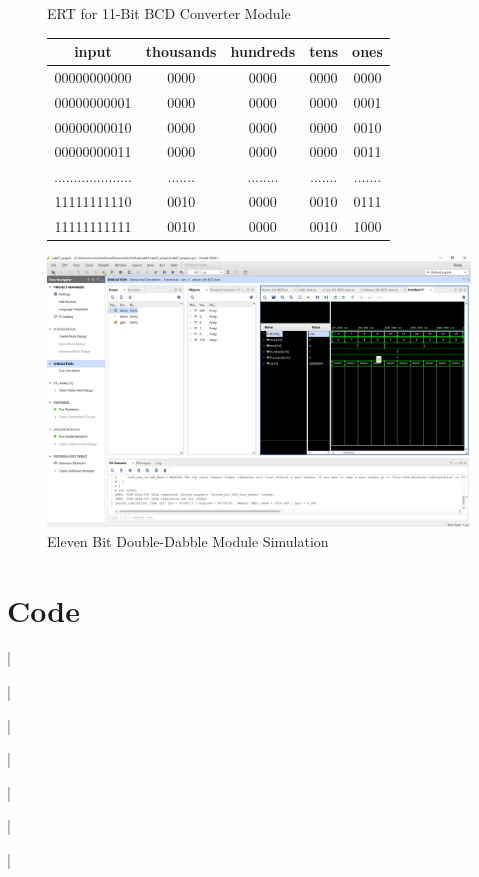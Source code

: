 \documentclass[11pt]{article}
\newcommand{\Verilog}[2][]{%
	
}
\begin{document}
\begin{figure}[ht]\centering
	\caption{ERT for 11-Bit BCD Converter Module}
		\label{tbl:example_table}
		\begin{tabular}{c|cccc}
			\toprule
			input & thousands & hundreds & tens & ones \\
			\midrule
			00000000000 & 0000 & 0000 & 0000 & 0000 \\
			00000000001 & 0000 & 0000 & 0000 & 0001 \\
			00000000010 & 0000 & 0000 & 0000 & 0010 \\
			00000000011 & 0000 & 0000 & 0000 & 0011 \\
			.................... & ....... & ........ & ....... & ....... \\
			11111111110 & 0010 & 0000 & 0010 & 0111 \\
			11111111111 & 0010 & 0000 & 0010 & 1000 \\
			\bottomrule
		\end{tabular} 
	\includegraphics[width=1\textwidth,trim=19cm 15cm 0.5cm 4.5cm,clip]{elev_BCD_test_screenshot}
	\caption{Eleven Bit Double-Dabble Module Simulation}
	\label{fig:sim_with_table}
\end{figure}


\section*{Code}

\Verilog[firstline=22, lastline=40, caption=Add3 Module Code]{Lab07_project/codedirectory/add3.sv}|

\Verilog[firstline=22, lastline=42, caption=Add3 TB]{Lab07_project/codedirectory/add3_test.sv}|

\Verilog[firstline=22, lastline=50, caption=6-Bit BCD Converter Code]{Lab07_project/codedirectory/six_bit_BCD.sv}|

\Verilog[firstline=22, lastline=44, caption=6-Bit BCD Converter TB]{Lab07_project/codedirectory/six_bit_BCD_test.sv}|

\Verilog[firstline=22, lastline=114, caption=11-Bit BCD Converter Code]{Lab07_project/codedirectory/eleven_bit_BCD.sv}|

\Verilog[firstline=22, lastline=46, caption=11-Bit BCD Converter TB]{Lab07_project/codedirectory/elev_BCD_test_.sv}|

\Verilog[firstline=22, lastline=71, caption=Top Level Module]{Lab07_project/codedirectory/sseg1_BCD_wrapper.sv}|
\end{document}
